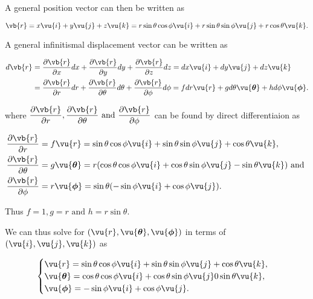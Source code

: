 \documentclass[english,a4paper,12pt]{report}
\begin{document}
A general position vector can then be written as 

\begin{equation}
    \vb{r} = x \vu{i} + y \vu{j} + z \vu{k} = r\sin \theta \cos \phi \vu{i} + r\sin \theta \sin \phi \vu{j} + r \cos \theta \vu{k} .
\end{equation}

A general infinitismal displacement vector can be written as 

\begin{equation}
    \begin{aligned}
    d \vb{r} &= \frac{\partial \vb{r} }{\partial x} dx + \frac{\partial \vb{r} }{\partial y} dy + \frac{\partial \vb{r} }{\partial z} dz = dx \vu{i} + dy \vu{j} + dz \vu{k} \\ &= \frac{\partial \vb{r} }{\partial r} dr + \frac{\partial \vb{r} }{\partial \theta }d\theta + \frac{\partial \vb{r} }{\partial \phi }d \phi =f dr \vu{r} +g d\theta \vu{\boldsymbol{\theta } } +h  d \phi \vu{\boldsymbol{\phi } }. 
    \end{aligned}
\end{equation}

where \(\displaystyle \frac{\partial \vb{r} }{\partial r}, \frac{\partial \vb{r} }{\partial \theta } \text { and } \frac{\partial \vb{r} }{\partial \phi } \) can be found by direct differentiaion as 

\begin{equation}
	\begin{aligned} 
		\frac{\partial \vb{r} }{\partial r}   &= f \vu{r} = \sin{\theta}\cos{\phi}\vu{i} + \sin{\theta}\sin{\phi}\vu{j} + \cos{\theta}\vu{k}, \\
		\frac{\partial \vb{r} }{\partial \theta }  &= g \vu{\boldsymbol{\theta }} = r(\cos{\theta}\cos{\phi}\vu{i} + \cos{\theta}\sin{\phi}\vu{j} - \sin{\theta}\vu{k})\text { and }  \\
		\frac{\partial \vb{r} }{\partial \phi }  &= r \vu{\boldsymbol{\phi } } = \sin \theta (-\sin{\phi}\vu{i} + \cos{\phi}\vu{j}). 
	\end{aligned} 
\end{equation}

Thus \(f = 1, g = r \text { and }  h = r\sin \theta \).

We can thus solve for \((\vu{r} , \vu{\boldsymbol{\theta } }, \vu{\boldsymbol{\phi } })\) in terms of \((\vu{i}, \vu{j} ,\vu{k} )\) as 

\begin{equation}
    \begin{cases}
        \vu{r} = \sin \theta \cos \phi  \vu{i}  + \sin \theta \sin \phi  \vu{j}  + \cos \theta  \vu{k},  \\
        \vu{\boldsymbol{\theta } } = \cos \theta \cos \phi \vu{i}  + \cos \theta \sin \phi \vu{j} 0 \sin \theta \vu{k}, \\
        \vu{\boldsymbol{\phi } } = -\sin \phi  \vu{i} + \cos \phi \vu{j}. 
    \end{cases}
\end{equation}
\end{document}
